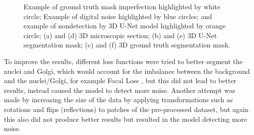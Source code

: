 \begin{figure}[!htb]
\hfil   
{}\hfil
{}
\caption{Example of ground truth mask imperfection highlighted by white circle; Example of digital noise highlighted by blue circles; and example of nondetection by 3D U-Net model highlighted by orange circle; (a) and (d) 3D microscopic section; (b) and (e) 3D U-Net segmentation mask; (c) and (f) 3D ground truth segmentation mask.}
\label{fig:errors-unet}



\end{figure}

To improve the results, different loss functions were tried to better segment the nuclei and Golgi, which would account for the imbalance between the background and the nuclei/Golgi, for example Focal Loss \cite{focal_loss}, but this did not lead to better results, instead caused the model to detect more noise. Another attempt was made by increasing the size of the data by applying transformations such as rotations and flips (reflections) to patches of the pre-processed dataset, but again this also did not produce better results but resulted in the model detecting more noise.

